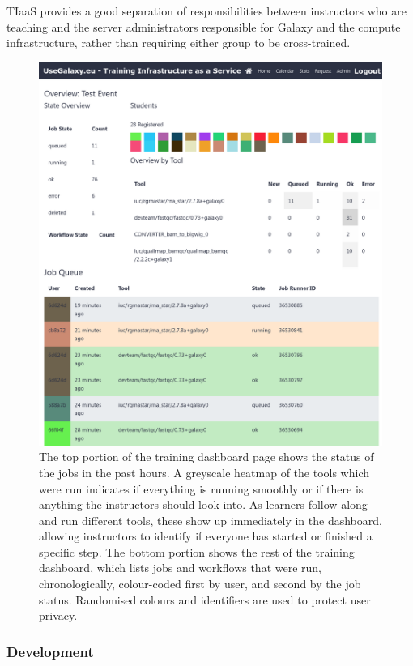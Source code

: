 \documentclass[a4paper,num-refs]{oup-contemporary}
\begin{document}
TIaaS provides a good separation of responsibilities between instructors who are teaching and the server administrators responsible for Galaxy and the compute infrastructure, rather than requiring either group to be cross-trained.

\begin{figure}[bt!]
\centering
\includegraphics[width=\linewidth]{images/dashboard.png}
\caption{The top portion of the training dashboard page shows the status of the jobs in the past hours. A greyscale heatmap of the tools which were run indicates if everything is running smoothly or if there is anything the instructors should look into. As learners follow along and run different tools, these show up immediately in the dashboard, allowing instructors to identify if everyone has started or finished a specific step. The bottom portion shows the rest of the training dashboard, which lists jobs and workflows that were run, chronologically, colour-coded first by user, and second by the job status. Randomised colours and identifiers are used to protect user privacy.}\label{figure:dashboard}
\end{figure}

\subsubsection{Development}
\end{document}
